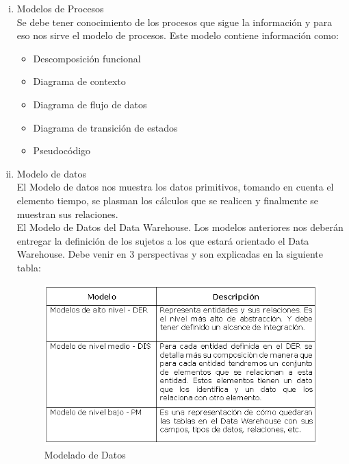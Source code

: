 \documentclass[11pt,a4paper]{article}
\begin{document}
\begin{enumerate}[A.]
\begin{enumerate}[i.]
				\item Modelos de Procesos\\
				Se debe tener conocimiento de los procesos que sigue la información y para eso nos sirve el modelo de procesos. Este modelo contiene información como:
					\begin{itemize}
						\item Descomposición funcional
						\item  Diagrama de contexto
						\item Diagrama de flujo de datos
						\item Diagrama de transición de estados
						\item Pseudocódigo\\
					\end{itemize}				
				\item Modelo de datos\\
				El Modelo de datos nos muestra los datos primitivos, tomando en cuenta el elemento tiempo, se plasman los cálculos que se realicen y finalmente se muestran sus relaciones.\\
							
				El Modelo de Datos del Data Warehouse. Los modelos anteriores nos deberán entregar la definición de los sujetos a los que estará orientado el Data Warehouse. Debe venir en 3 perspectivas y son explicadas en la siguiente tabla:
				
					\begin{figure}[!ht]
						\begin{center}
							\includegraphics[scale=0.8]{./Imagenes/img02}	
							\caption{Modelado de Datos}		
						\end{center}
					\end{figure}
				

\end{enumerate}
\end{enumerate}
\end{document}
